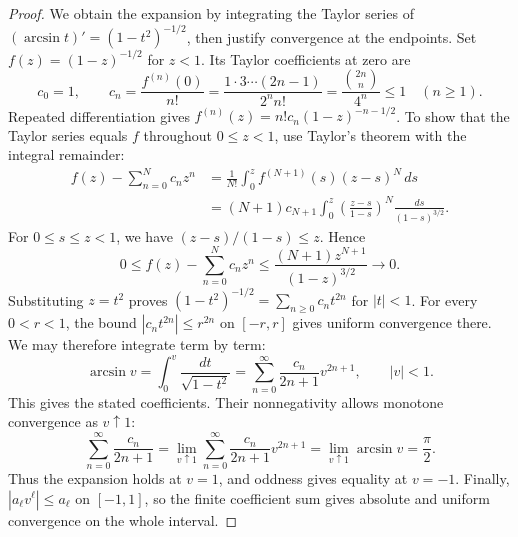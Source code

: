 \documentclass[11pt,twoside]{article}
\theoremstyle{definition}
\theoremstyle{remark}
\begin{document}
\begin{proof}
We obtain the expansion by integrating the Taylor series of
$(\arcsin t)'=(1-t^2)^{-1/2}$, then justify convergence at the endpoints.
Set $f(z)=(1-z)^{-1/2}$ for $z<1$. Its Taylor coefficients at zero are
\[
c_0=1,\qquad
c_n=\frac{f^{(n)}(0)}{n!}
=\frac{1\cdot3\cdots(2n-1)}{2^n n!}
=\frac{\binom{2n}{n}}{4^n}\le1\quad(n\ge1).
\]
Repeated differentiation gives
$f^{(n)}(z)=n!c_n(1-z)^{-n-1/2}$.
To show that the Taylor series equals $f$ throughout $0\le z<1$, use
Taylor's theorem with the integral remainder:
\begin{align*}
f(z)-\sum_{n=0}^N c_nz^n
&=\frac1{N!}\int_0^z f^{(N+1)}(s)(z-s)^N\,ds\\
&=(N+1)c_{N+1}\int_0^z
\left(\frac{z-s}{1-s}\right)^N\frac{ds}{(1-s)^{3/2}}.
\end{align*}
For $0\le s\le z<1$, we have $(z-s)/(1-s)\le z$. Hence
\[
0\le f(z)-\sum_{n=0}^N c_nz^n
\le\frac{(N+1)z^{N+1}}{(1-z)^{3/2}}
\longrightarrow0.
\]
Substituting $z=t^2$ proves
$(1-t^2)^{-1/2}=\sum_{n\ge0}c_nt^{2n}$ for $|t|<1$.
For every $0<r<1$, the bound $|c_nt^{2n}|\le r^{2n}$ on $[-r,r]$
gives uniform convergence there. We may therefore integrate term by term:
\[
\arcsin v=\int_0^v\frac{dt}{\sqrt{1-t^2}}
=\sum_{n=0}^\infty\frac{c_n}{2n+1}v^{2n+1},
\qquad |v|<1.
\]
This gives the stated coefficients. Their nonnegativity allows monotone
convergence as $v\uparrow1$:
\[
\sum_{n=0}^\infty\frac{c_n}{2n+1}
=\lim_{v\uparrow1}\sum_{n=0}^\infty\frac{c_n}{2n+1}v^{2n+1}
=\lim_{v\uparrow1}\arcsin v=\frac\pi2.
\]
Thus the expansion holds at $v=1$, and oddness gives equality at $v=-1$.
Finally, $|a_\ell v^\ell|\le a_\ell$ on $[-1,1]$, so the finite coefficient
sum gives absolute and uniform convergence on the whole interval.
\end{proof}
\end{document}
